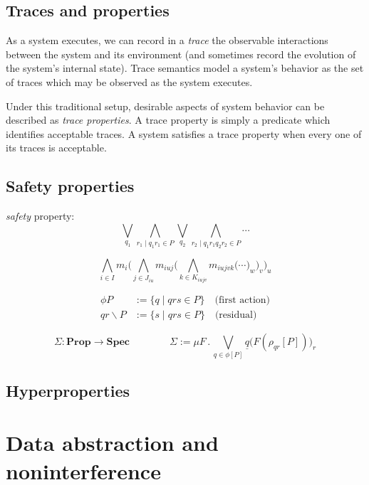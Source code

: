\documentclass[11pt]{article}
\begin{document}
\subsection{Traces and properties} %

As a system executes, we can record in a \emph{trace}
the observable interactions between the system and its environment
(and sometimes record the evolution of the system's internal state).
Trace semantics model a system's behavior as
the set of traces which may be observed as the system executes.

Under this traditional setup,
desirable aspects of system behavior
can be described as \emph{trace properties}.
A trace property is simply a predicate which identifies
acceptable traces.
A system satisfies a trace property when
every one of its traces is acceptable.



\subsection{Safety properties} %

\emph{safety} property:
\[
  \bigvee_{q_1} \bigwedge_{r_1 \mid q_1 r_1 \in P}
  \bigvee_{q_2} \bigwedge_{r_2 \mid q_1 r_1 q_2 r_2 \in P}
  \cdots
\]

\[
  \bigwedge_{i \in I} m_i \Big(
  \bigwedge_{j \in J_{iu}} m_{iuj} \Big(
  \bigwedge_{k \in K_{iujv}} m_{iujvk} \Big(
  \cdots
  \Big)_w
  \Big)_v
  \Big)_u
\]

\begin{align*}
  \phi P &:= \{ q \mid qrs \in P \}  \quad \text{(first action)} \\
  qr \backslash P &:= \{ s \mid qrs \in P \} \quad \text{(residual)}
\end{align*}

\[
  \Sigma : \mathbf{Prop} \rightarrow \mathbf{Spec}
  \qquad \qquad
  \Sigma := \mu F \mathbin. \bigvee_{q \in \phi[P]}
    \underline{q} \big( F(\rho_{qr}[P]) \big)_r
\]


\subsection{Hyperproperties}


\section{Data abstraction and noninterference}
\end{document}
